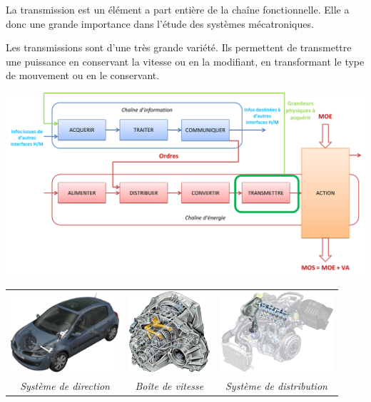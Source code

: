 \documentclass[11pt,oneside]{article}
\begin{document}
\begin{minipage}[c]{.45\linewidth}
La transmission est un élément a part entière de la chaîne fonctionnelle. Elle a donc une grande importance dans l'étude des systèmes mécatroniques.


Les transmissions sont d'une très grande variété. Ils permettent de transmettre une puissance en conservant la vitesse ou en la modifiant, en transformant le type de mouvement ou en le conservant.
\end{minipage}\hfill
\begin{minipage}[c]{.5\linewidth}
\begin{center}
\includegraphics[width=\textwidth]{png/ch_fonc}
\end{center}
\end{minipage}

\begin{center}
\begin{tabular}{ccc}
\includegraphics[height=3cm]{png/ex_3} &
\includegraphics[height=3cm]{png/ex_2} &
\includegraphics[height=3cm]{png/ex_1} \\
\textit{Système de direction} & \textit{Boîte de vitesse}&\textit{Système de distribution}\\
\end{tabular}
\end{center}
\end{document}
